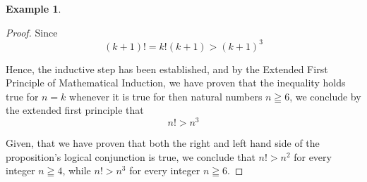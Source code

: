 \documentclass{book}
\theoremstyle{definition}
\newtheorem{example}{Example}[definition]
\theoremstyle{remark}
\begin{document}
\begin{example}
\begin{proof}
           Since
                \begin{equation}
                    (k+1)! = k!(k+1) > (k+1)^3 
                \end{equation}
            
            Hence, the inductive step has been established, and by the Extended First Principle of Mathematical Induction, we have proven that the inequality holds true for $n=k$ whenever it is true for then natural numbers $n \geqq 6$, we conclude by the extended first principle that
                \begin{equation*}
                    n! > n^3
                \end{equation*}
    
Given, that we have proven that both the right and left hand side of the proposition's logical conjunction is true, we conclude that $n! > n^2$ for every integer $n \geqq 4$, while $n! > n^3$ for every integer $n \geqq 6$. 
\end{proof}
\end{example}
\end{document}
